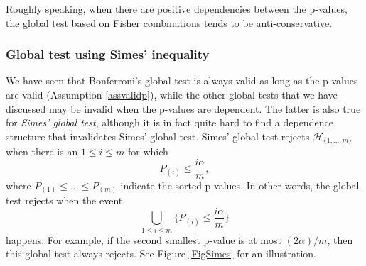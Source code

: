 \documentclass[11pt]{article}
\theoremstyle{plain}
\theoremstyle{definition}
\newcommand{\Hy}{\mathcal{H}}
\begin{document}
Roughly speaking, when there are positive dependencies between the p-values, the global test based on Fisher combinations tends to be anti-conservative.


\subsubsection{Global test using Simes' inequality} \label{secglobalsimes}

We have seen that Bonferroni's global test is always valid as long as the p-values are valid (Assumption \ref{assvalidp}), while the other global tests that we have discussed may be invalid when the p-values are dependent. The latter is also true for \emph{Simes' global test}, although it is in fact quite hard to find a dependence structure that invalidates Simes' global test. Simes'  global test rejects $\Hy_{\{1,...,m\}}$ when
there is an $1\leq i \leq m$ for which
$$P_{(i)}\leq \frac{i\alpha}{m},$$
where $P_{(1)}\leq ...\leq P_{(m)}$ indicate the sorted p-values.  In other words, the global test rejects when the event
\begin{equation}  \label{eventSimes}
 \bigcup_{1 \leq i \leq m} \{P_{(i)}\leq \frac{i\alpha}{m} \} 
\end{equation} 
happens.
For example, if the second smallest p-value is at most $(2\alpha)/m$, then this global test always rejects. See Figure \ref{FigSimes} for an illustration.
\end{document}

